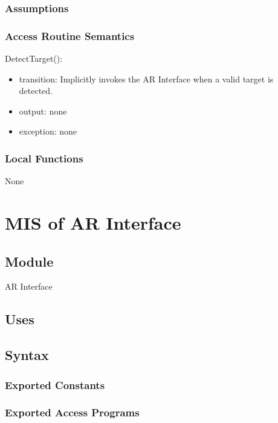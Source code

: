 \documentclass[12pt, titlepage]{article}
\begin{document}
\subsubsection{Assumptions}

\subsubsection{Access Routine Semantics}

\noindent DetectTarget():
\begin{itemize}
\item transition: Implicitly invokes the AR Interface when a valid target is detected.
\item output: none
\item exception: none
\end{itemize}

\subsubsection{Local Functions}

None

\newpage

\section{MIS of AR Interface} \label{mARInterface}

\subsection{Module}

AR Interface

\subsection{Uses}

\subsection{Syntax}

\subsubsection{Exported Constants}

\subsubsection{Exported Access Programs}
\end{document}

